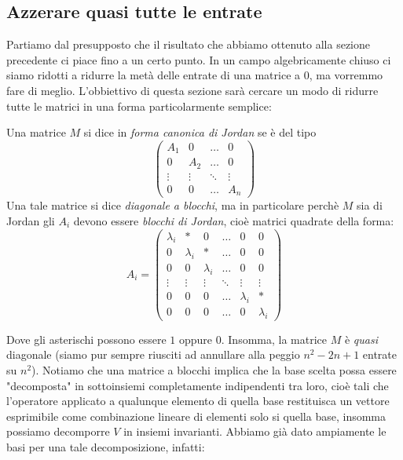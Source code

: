 \documentclass[11pt]{scrartcl}
\begin{document}
   	 \subsection{Azzerare quasi tutte le entrate}
   	 Partiamo dal presupposto che il risultato che abbiamo ottenuto alla sezione precedente ci piace fino a un certo punto. In un campo algebricamente chiuso ci siamo ridotti a ridurre la metà delle entrate di una matrice a $0$, ma vorremmo fare di meglio. L'obbiettivo di questa sezione sarà cercare un modo di ridurre tutte le matrici in una forma particolarmente semplice:
   	 \begin{definition}
   	 	Una matrice $M$ si dice in \textit{forma canonica di Jordan} se è del tipo
   	 	$$
   	 	\begin{pmatrix}
   	 		A_1 & 0 & \dots & 0 \\
   	 		0 & A_2 & \dots & 0 \\
   	 		\vdots & \vdots & \ddots & \vdots \\
   	 		0 & 0 & \dots & A_n
   	 	\end{pmatrix}
   	 	$$
   	 	Una tale matrice si dice \textit{diagonale a blocchi}, ma in particolare perchè $M$ sia di Jordan
   	 	gli $A_i$ devono essere \textit{blocchi di Jordan}, cioè matrici quadrate della forma:
   	 	$$A_i=
   	 	\begin{pmatrix}
   	 		\lambda_i & * & 0 & \dots &0 & 0 \\
   	 		0 & \lambda_i & * & \dots &0 & 0 \\
   	 		0 & 0 & \lambda_i & \dots &0 & 0 \\
   	 		\vdots & \vdots & \vdots & \ddots & \vdots & \vdots \\
   	 		0 & 0 & 0 & \dots & \lambda_i & * \\
   	 		0 & 0 & 0 & \dots & 0 & \lambda_i
   	 	\end{pmatrix}
   	 	$$
   	 \end{definition}
   	 Dove gli asterischi possono essere $1$ oppure $0$.
   	 Insomma, la matrice $M$ è \textit{quasi} diagonale (siamo pur sempre riusciti ad annullare alla peggio $n^2-2n+1$ entrate su $n^2$). Notiamo che una matrice a blocchi implica che la base scelta possa essere "decomposta" in sottoinsiemi completamente indipendenti tra loro, cioè tali che l'operatore applicato a qualunque elemento di quella base restituisca un vettore esprimibile come combinazione lineare di elementi solo si quella base, insomma possiamo decomporre $V$ in insiemi invarianti. Abbiamo già dato ampiamente le basi per una tale decomposizione, infatti:
\end{document}
